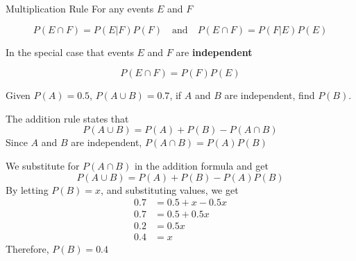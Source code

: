 \begin{summarybox}{Multiplication Rule}\label{summary_multiplication_rule_for_intersections}
    For any events \(E\) and \(F\)

    \[ P(E \cap F) = P(E | F)P(F) \quad \text{and} \quad P(E \cap F) = P(F| E)P(E) \]

    In the special case that events \(E\) and \(F\) are \textbf{independent}

    \[ P(E \cap F) = P(F)P(E) \]
\end{summarybox}

\begin{example}
    Given \( P(A) = 0.5 \), \( P(A \cup B) = 0.7 \), if \( A \) and \( B \) are independent, find \( P(B) \).
\end{example}

\begin{solution}
    The addition rule states that
    \[ P(A \cup B) = P(A) + P(B) - P(A \cap B) \]
    Since \( A \) and \( B \) are independent, \( P(A \cap B) = P(A)P(B) \)

    We substitute for \( P(A \cap B) \) in the addition formula and get
    \[ P(A \cup B) = P(A) + P(B) - P(A)P(B) \]
    By letting \( P(B) = x \), and substituting values, we get
    \begin{align*}
        0.7 & = 0.5 + x - 0.5x \\
        0.7 & = 0.5 + 0.5x     \\
        0.2 & = 0.5x           \\
        0.4 & = x
    \end{align*}
    Therefore, \( P(B) = 0.4 \)
\end{solution}